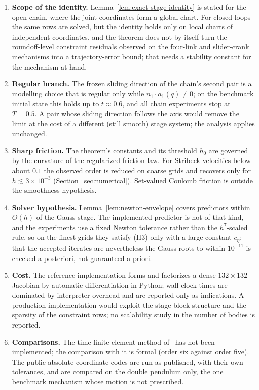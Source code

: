 \documentclass[preprint,12pt]{elsarticle}
\begin{document}
\begin{enumerate}
  \item \textbf{Scope of the identity.} Lemma~\ref{lem:exact-stage-identity} is stated for the open
  chain, where the joint coordinates form a global chart. For closed loops the same rows are solved,
  but the identity holds only on local charts of independent coordinates, and the theorem does not
  by itself turn the roundoff-level constraint residuals observed on the four-link and slider-crank
  mechanisms into a trajectory-error bound; that needs a stability constant for the mechanism at
  hand.
  \item \textbf{Regular branch.} The frozen sliding direction of the chain's second pair is a
  modelling choice that is regular only while $n_1\cdot a_1(q)\neq0$; on the benchmark initial state
  this holds up to $t\approx0.6$, and all chain experiments stop at $T=0.5$. A pair whose sliding
  direction follows the axis would remove the limit at the cost of a different (still smooth) stage
  system; the analysis applies unchanged.
  \item \textbf{Sharp friction.} The theorem's constants and its threshold $h_0$ are governed by the
  curvature of the regularized friction law. For Stribeck velocities below about $0.1$ the observed
  order is reduced on coarse grids and recovers only for $h\lesssim3\times10^{-3}$
  (Section~\ref{sec:numerical}). Set-valued Coulomb friction is outside the smoothness hypothesis.
  \item \textbf{Solver hypothesis.} Lemma~\ref{lem:newton-envelope} covers predictors within $O(h)$
  of the Gauss stage. The implemented predictor is not of that kind, and the experiments use a fixed
  Newton tolerance rather than the $h^7$-scaled rule, so on the finest grids they satisfy (H3) only
  with a large constant $c_\eta$; that the accepted iterates are nevertheless the Gauss roots to
  within $10^{-11}$ is checked a posteriori, not guaranteed a priori.
  \item \textbf{Cost.} The reference implementation forms and factorizes a dense
  $132\times132$ Jacobian by automatic differentiation in Python; wall-clock times are dominated by
  interpreter overhead and are reported only as indications. A production implementation would
  exploit the stage-block structure and the sparsity of the constraint rows; no scalability study
  in the number of bodies is reported.
  \item \textbf{Comparisons.} The time finite-element method of~\cite{chaturvedi2026tfe} has not
  been implemented; the comparison with it is formal (order six against order five). The public
  absolute-coordinate codes are run as published, with their own tolerances, and are compared on the
  double pendulum only, the one benchmark mechanism whose motion is not prescribed.
\end{enumerate}
\end{document}
